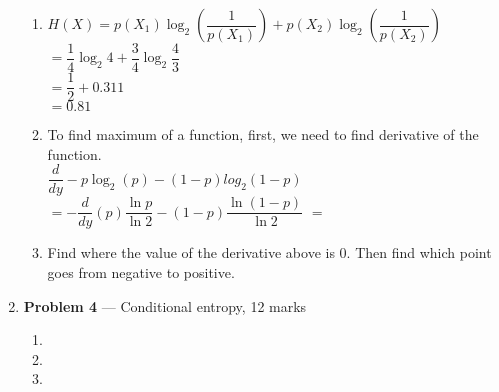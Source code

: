 \documentclass[11pt]{article}
\theoremstyle{definition}
\begin{document}
\begin{enumerate}
	
	\begin{enumerate}
		\item 
		$H(X) = p(X_{1}) \log_{2}(\dfrac{1}{p(X_{1})}) + p(X_{2})\log_{2}(\dfrac{1}{p(X_{2})})$\\
		$= \dfrac{1}{4} \log_{2} 4 + \dfrac{3}{4} \log_{2} \dfrac{4}{3}$\\
		$= \dfrac{1}{2} + 0.311$\\
		$= 0.81$
		\item To find maximum of a function, first, we need to find derivative of the function.\\
		$\dfrac{d}{dy} -p \log_{2}(p)-(1-p)log_{2}(1-p)$\\
		$ =- \dfrac{d}{dy} (p) \dfrac{\ln p}{\ln 2} - (1-p)\dfrac{\ln (1-p)}{\ln 2} $
		$ = $
		
		
		
		\item  Find where the value of the derivative above is 0. Then find which point goes from negative to positive. 
	
	\end{enumerate}
	
	\item[] \textbf{Problem 4} --- Conditional entropy, 12 marks
		
		\begin{enumerate}
			\item
			
			\item
			\item
		\end{enumerate}
	\end{enumerate}
	
\end{document}
